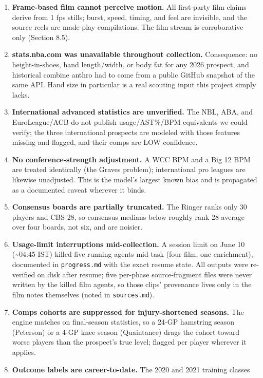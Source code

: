 \documentclass[
  10pt,
]{article}
\providecommand{\tightlist}{%
  \setlength{\itemsep}{0pt}\setlength{\parskip}{0pt}}
\begin{document}
\begin{enumerate}
\def\labelenumi{\arabic{enumi}.}
\tightlist
\item
  \textbf{Frame-based film cannot perceive motion.} All first-party film claims
  derive from 1 fps stills; burst, speed, timing, and feel are invisible, and
  the source reels are made-play compilations. The film stream is corroborative
  only (Section 8.5).
\item
  \textbf{stats.nba.com was unavailable throughout collection.} Consequence: no
  height-in-shoes, hand length/width, or body fat for any 2026 prospect, and
  historical combine anthro had to come from a public GitHub snapshot of the
  same API. Hand size in particular is a real scouting input this project simply
  lacks.
\item
  \textbf{International advanced statistics are unverified.} The NBL, ABA, and
  EuroLeague/ACB do not publish usage/AST\%/BPM equivalents we could verify; the
  three international prospects are modeled with those features missing and
  flagged, and their comps are LOW confidence.
\item
  \textbf{No conference-strength adjustment.} A WCC BPM and a Big 12 BPM are
  treated identically (the Graves problem); international pro leagues are
  likewise unadjusted. This is the model's largest known bias and is propagated
  as a documented caveat wherever it binds.
\item
  \textbf{Consensus boards are partially truncated.} The Ringer ranks only 30
  players and CBS 28, so consensus medians below roughly rank 28 average over
  four boards, not six, and are noisier.
\item
  \textbf{Usage-limit interruptions mid-collection.} A session limit on June 10
  (\textasciitilde04:45 IST) killed five running agents mid-task (four film, one
  enrichment), documented in \texttt{progress.md} with the exact resume state.
  All outputs were re-verified on disk after resume; five per-phase
  source-fragment files were never written by the killed film agents, so those
  clips' provenance lives only in the film notes themselves (noted in
  \texttt{sources.md}).
\item
  \textbf{Comps cohorts are suppressed for injury-shortened seasons.} The engine
  matches on final-season statistics, so a 24-GP hamstring season (Peterson) or
  a 4-GP knee season (Quaintance) drags the cohort toward worse players than the
  prospect's true level; flagged per player wherever it applies.
\item
  \textbf{Outcome labels are career-to-date.} The 2020 and 2021 training classes

\end{enumerate}
\end{document}
